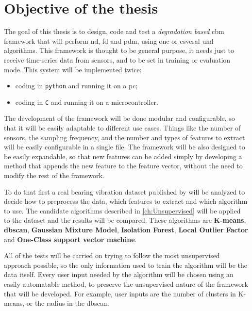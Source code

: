 \section{Objective of the thesis}
\label{sec:objectives}

The goal of this thesis is to design, code and test a \emph{degradation based} \gls{cbm} framework that will perform \gls{nd}, \gls{fd} and \gls{pdm}, using one or esveral \gls{uml} algorithms. This framework is thought to be general purpose, it needs just to receive time-series data from sensors, and to be set in training or evaluation mode.
This system will be implemented twice:
\begin{itemize}
    \item  coding in \texttt{python} and running it on a \gls{pc};
    \item   coding in \texttt{C} and running it on a microcontroller.
\end{itemize}

The development of the framework will be done modular and configurable, so that it will be easily adaptable to different use cases. Things like the number of sensors, the sampling frequency, and the number and types of features to extract will be easily configurable in a single file. The framework will be also designed to be easily expandable, so that new features can be added simply by developing a method that appends the new feature to the feature vector, without the need to modify the rest of the framework.

To do that first a real bearing vibration dataset published by \cite{IMSpaper} will be analyzed to decide how to preprocess the data, which features to extract and which algorithm to use. 
The candidate algorithms described in \autoref{ch:Unsupervised} will be applied to the dataset and the results will be compared. These algorithms are \textbf{K-means}, \textbf{\gls{dbscan}}, \textbf{Gaussian Mixture Model}, \textbf{Isolation Forest}, \textbf{Local Outlier Factor} and \textbf{One-Class support vector machine}. 

All of the tests will be carried on trying to follow the most unsupervised approach possible, so the only information used to train the algorithm will be the data itself. Every user input needed by the algorithm will be chosen using an easily automatable method, to preserve the unsupervised nature of the framework that will be developed. For example, user inputs are the number of clusters in K-means, or the radius in the \gls{dbscan}.

